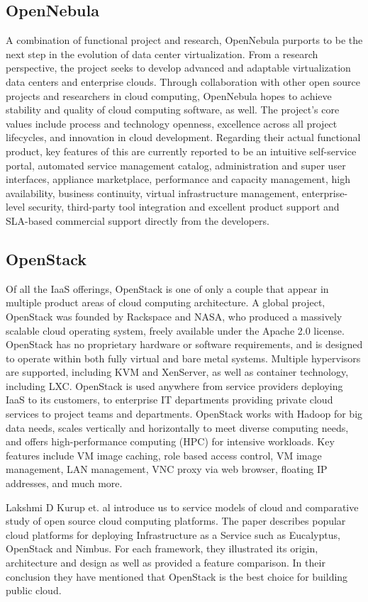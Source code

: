     
        \subsection{OpenNebula}
        
        \par A combination of functional project and research, OpenNebula purports to be the next step in the evolution of data center virtualization. From a research perspective, the project seeks to develop advanced and adaptable virtualization data centers and enterprise clouds. Through collaboration with other open source projects and researchers in cloud computing, OpenNebula hopes to achieve stability and quality of cloud computing software, as well. The project's core values include process and technology openness, excellence across all project lifecycles, and innovation in cloud development. Regarding their actual functional product, key features of this are currently reported to be an intuitive self-service portal, automated service management catalog, administration and super user interfaces, appliance marketplace, performance and capacity management, high availability, business continuity, virtual infrastructure management, enterprise-level security, third-party tool integration and excellent product support and SLA-based commercial support directly from the developers.
    
        \subsection{OpenStack}
        
        \par Of all the IaaS offerings, OpenStack is one of only a couple that appear in multiple product areas of cloud computing architecture. A global project, OpenStack was founded by Rackspace and NASA, who produced a massively scalable cloud operating system, freely available under the Apache 2.0 license. OpenStack has no proprietary hardware or software requirements, and is designed to operate within both fully virtual and bare metal systems. Multiple hypervisors are supported, including KVM and XenServer, as well as container technology, including LXC. OpenStack is used anywhere from service providers deploying IaaS to its customers, to enterprise IT departments providing private cloud services to project teams and departments. OpenStack works with Hadoop for big data needs, scales vertically and horizontally to meet diverse computing needs, and offers high-performance computing (HPC) for intensive workloads. Key features include VM image caching, role based access control, VM image management, LAN management, VNC proxy via web browser, floating IP addresses, and much more.
    
    \par Lakshmi D Kurup et. al \cite{lakshmi} introduce us to service models of cloud and comparative study of open source cloud computing platforms. The paper describes popular cloud platforms for deploying Infrastructure as a Service such as Eucalyptus, OpenStack and Nimbus. For each framework, they illustrated its origin, architecture and design as well as provided a feature comparison. In their conclusion they have mentioned that OpenStack is the best choice for building public cloud.